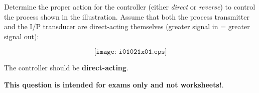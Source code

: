 

Determine the proper action for the controller (either {\it direct} or {\it reverse}) to control the process shown in the illustration.  Assume that both the process transmitter and the I/P transducer are direct-acting themselves (greater signal in = greater signal out):

$$\texttt{[image: i01021x01.eps]}$$







The controller should be {\bf direct-acting}.







{\bf This question is intended for exams only and not worksheets!}.



